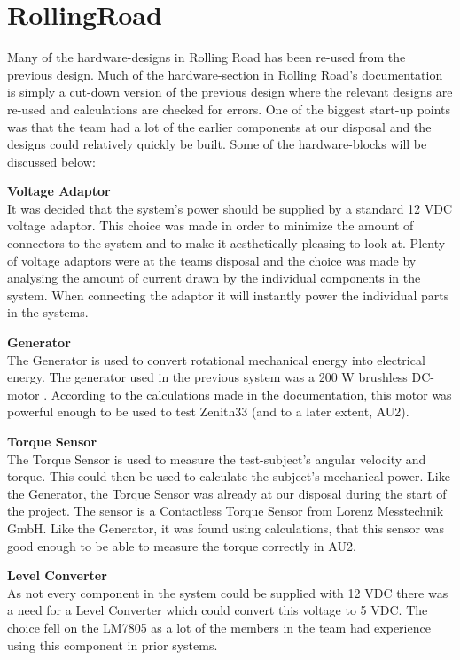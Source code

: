 \section{RollingRoad}
Many of the hardware-designs in Rolling Road has been re-used from the previous design\cite{BAC_rullefelt}. Much of the hardware-section in Rolling Road's documentation\cite{RR} is simply a cut-down version of the previous design where the relevant designs are re-used and calculations are checked for errors. One of the biggest start-up points was that the team had a lot of the earlier components at our disposal and the designs could relatively quickly be built. Some of the hardware-blocks will be discussed below:

\textbf{Voltage Adaptor}\\ 
It was decided that the system's power should be supplied by a standard 12 VDC voltage adaptor. This choice was made in order to minimize the amount of connectors to the system and to make it aesthetically pleasing to look at. Plenty of voltage adaptors were at the teams disposal and the choice was made by analysing the amount of current drawn by the individual components in the system. When connecting the adaptor it will instantly power the individual parts in the systems.

\textbf{Generator}\\
The Generator is used to convert rotational mechanical energy into electrical energy. The generator used in the previous system\cite{BAC_rullefelt} was a 200 W brushless DC-motor \cite{Maxon}. According to the calculations made in the documentation\cite{RR}, this motor was powerful enough to be used to test Zenith33\cite{BAC_zenith33} (and to a later extent, AU2).

\textbf{Torque Sensor}\\
The Torque Sensor is used to measure the test-subject's angular velocity and torque. This could then be used to calculate the subject's mechanical power. Like the Generator, the Torque Sensor was already at our disposal during the start of the project. The sensor is a Contactless Torque Sensor from Lorenz Messtechnik GmbH\cite{TorqueSensor}. Like the Generator, it was found using calculations, that this sensor was good enough to be able to measure the torque correctly in AU2.

\textbf{Level Converter}\\
As not every component in the system could be supplied with 12 VDC there was a need for a Level Converter which could convert this voltage to 5 VDC. The choice fell on the LM7805\cite{LM7805} as a lot of the members in the team had experience using this component in prior systems.

